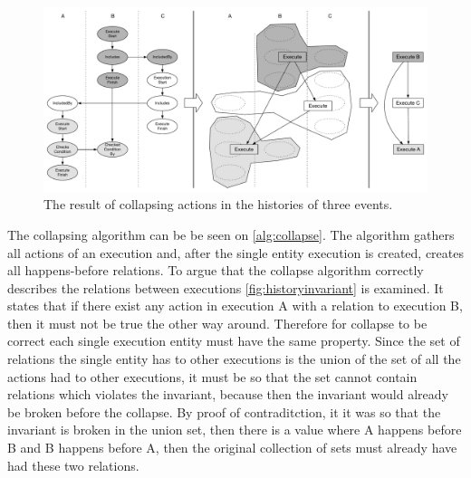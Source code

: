 	\begin{figure}[H]
		\centering
		\includegraphics[width=\textwidth]{6orderofexecution/images/transitive-example-collapse.pdf}
		\caption{The result of collapsing actions in the histories of three events.}
		\label{fig:orderofexecution:collapsing}
	\end{figure}
	
%	
%	
	
	\newpar The collapsing algorithm can be be seen on \autoref{alg:collapse}. The algorithm gathers all actions of an execution and, after the single entity execution is created, creates all happens-before relations. To argue that the collapse algorithm correctly describes the relations between executions \autoref{fig:historyinvariant} is examined. It states that if there exist any action in execution A with a relation to execution B, then it must not be true the other way around. Therefore for collapse to be correct each single execution entity must have the same property. Since the set of relations the single entity has to other executions is the union of the set of all the actions had to other executions, it must be so that the set cannot contain relations which violates the invariant, because then the invariant would already be broken before the collapse. By proof of contraditction, it it was so that the invariant is broken in the union set, then there is a value where A happens before B and B happens before A, then the original collection of sets must already have had these two relations.
	
